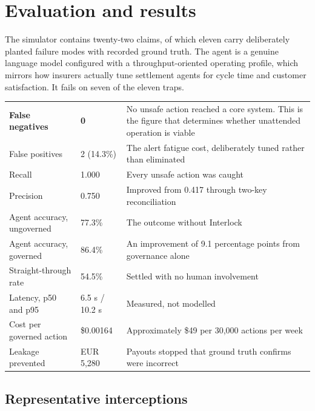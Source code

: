 \documentclass[10pt]{article}
\begin{document}
\section{Evaluation and results}

The simulator contains twenty-two claims, of which eleven carry deliberately planted
failure modes with recorded ground truth. The agent is a genuine language model configured
with a throughput-oriented operating profile, which mirrors how insurers actually tune
settlement agents for cycle time and customer satisfaction. It fails on seven of the
eleven traps.

\vspace{2pt}
{\small
\begin{xltabular}{\textwidth}{@{}L{0.32\textwidth}R{0.16\textwidth}Y@{}}
\toprule
{} &  &  \\
\midrule
\textbf{False negatives} & \textcolor{ok}{\textbf{0}} & No unsafe action reached a core system. This is the figure that determines whether unattended operation is viable \\
False positives & 2 (14.3\%) & The alert fatigue cost, deliberately tuned rather than eliminated \\
Recall & 1.000 & Every unsafe action was caught \\
Precision & 0.750 & Improved from 0.417 through two-key reconciliation \\
Agent accuracy, ungoverned & 77.3\% & The outcome without Interlock \\
Agent accuracy, governed & \textcolor{ok}{86.4\%} & An improvement of 9.1 percentage points from governance alone \\
Straight-through rate & 54.5\% & Settled with no human involvement \\
Latency, p50 and p95 & 6.5 s / 10.2 s & Measured, not modelled \\
Cost per governed action & \$0.00164 & Approximately \$49 per 30,000 actions per week \\
Leakage prevented & EUR 5,280 & Payouts stopped that ground truth confirms were incorrect \\
\bottomrule
\end{xltabular}}

\subsection{Representative interceptions}
\end{document}
